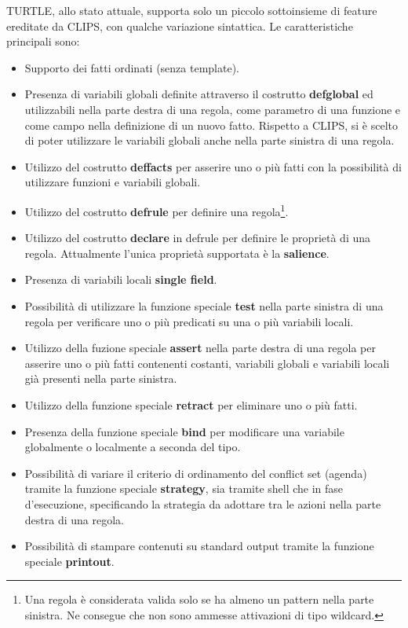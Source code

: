 TURTLE, allo stato attuale, supporta solo un piccolo sottoinsieme di feature ereditate da CLIPS, con qualche variazione sintattica.
Le caratteristiche principali sono:
\begin{itemize}
	\item Supporto dei fatti ordinati (senza template).
	\item Presenza di variabili globali definite attraverso il costrutto \textbf{defglobal} ed utilizzabili nella parte destra di una regola, come parametro di una funzione e come campo nella definizione di un nuovo fatto. Rispetto a CLIPS, si è scelto di poter utilizzare le variabili globali anche nella parte sinistra di una regola.
	\item Utilizzo del costrutto \textbf{deffacts} per asserire uno o più fatti con la possibilità di utilizzare funzioni e variabili globali.
	\item Utilizzo del costrutto \textbf{defrule} per definire una regola\footnote{Una regola è considerata valida solo se ha almeno un pattern nella parte sinistra. Ne consegue che non sono ammesse attivazioni di tipo wildcard.}. 
	\item Utilizzo del costrutto \textbf{declare} in defrule per definire le proprietà di una regola. Attualmente l'unica proprietà supportata è la \textbf{salience}.
	\item Presenza di variabili locali \textbf{single field}.
	\item Possibilità di utilizzare la funzione speciale \textbf{test} nella parte sinistra di una regola per verificare uno o più predicati su una o più variabili locali.
	\item Utilizzo della fuzione speciale \textbf{assert} nella parte destra di una regola per asserire uno o più fatti contenenti costanti, variabili globali e variabili locali già presenti nella parte sinistra.
	\item Utilizzo della funzione speciale \textbf{retract} per eliminare uno o più fatti.
	\item Presenza della funzione speciale \textbf{bind} per modificare una variabile globalmente o localmente a seconda del tipo.
	\item Possibilità di variare il criterio di ordinamento del conflict set (agenda) tramite la funzione speciale \textbf{strategy}, sia tramite shell che in fase d'esecuzione, specificando la strategia da adottare tra le azioni nella parte destra di una regola.
	\item Possibilità di stampare contenuti su standard output tramite la funzione speciale \textbf{printout}.
\end{itemize}


